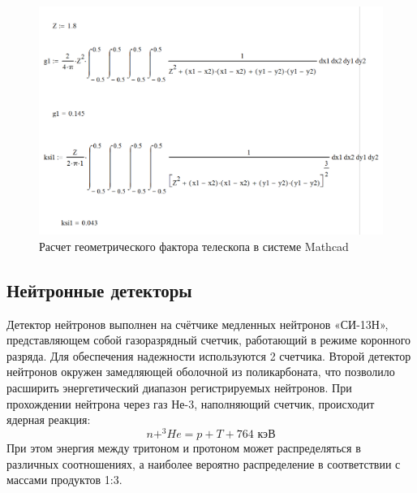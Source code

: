 \begin{figure}[h!]
\centering
\includegraphics[width=0.7\linewidth]{images/mathcadGeomfactor1}
\caption{ Расчет геометрического фактора телескопа в системе Mathcad}
\label{fig:mathcadGeomfactor}
\end{figure}





\subsection{Нейтронные детекторы}

Детектор нейтронов выполнен на счётчике медленных нейтронов «СИ-13Н», представляющем собой газоразрядный счетчик, работающий в режиме коронного разряда. Для обеспечения надежности используются 2 счетчика. Второй детектор нейтронов окружен замедляющей оболочной из поликарбоната, что позволило расширить энергетический диапазон регистрируемых нейтронов. При прохождении нейтрона через газ Не-3, наполняющий счетчик, происходит ядерная реакция:
\[ n+^3\!He = p+T+764 \textrm{ кэВ}\]
При этом энергия между тритоном и протоном может распределяться в различных соотношениях, а наиболее вероятно распределение в соответствии с массами продуктов 1:3.


